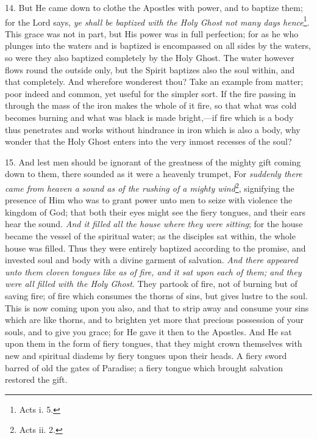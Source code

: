 14. But He came down to clothe the Apostles with power, and to baptize them; for the Lord says, \emph{ye shall be baptized with the Holy Ghost not many days hence}\footnote{Acts i. 5.}. This grace was not in part, but His power was in full perfection; for as he who plunges into the waters and is baptized is encompassed on all sides by the waters, so were they also baptized completely by the Holy Ghost. The water however flows round the outside only, but the Spirit baptizes also the soul within, and that completely. And wherefore wonderest thou? Take an example from matter; poor indeed and common, yet useful for the simpler sort. If the fire passing in through the mass of the iron makes the whole of it fire, so that what was cold becomes burning and what was black is made bright,—if fire which is a body thus penetrates and works without hindrance in iron which is also a body, why wonder that the Holy Ghost enters into the very inmost recesses of the soul?

15. And lest men should be ignorant of the greatness of the mighty gift coming down to them, there sounded as it were a heavenly trumpet, For \emph{suddenly there came from heaven a sound as of the rushing of a mighty wind}\footnote{Acts ii. 2.}, signifying the presence of Him who was to grant power unto men to seize with violence the kingdom of God; that both their eyes might see the fiery tongues, and their ears hear the sound. \emph{And it filled all the house where they were sitting}; for the house became the vessel of the spiritual water; as the disciples sat within, the whole house was filled. Thus they were entirely baptized according to the promise, and invested soul and body with a divine garment of salvation. \emph{And there appeared unto them cloven tongues like as of fire, and it sat upon each of them; and they were all filled with the Holy Ghost}. They partook of fire, not of burning but of saving fire; of fire which consumes the thorns of sins, but gives lustre to the soul. This is now coming upon you also, and that to strip away and consume your sins which are like thorns, and to brighten yet more that precious possession of your souls, and to give you grace; for He gave it then to the Apostles. And He sat upon them in the form of fiery tongues, that they might crown themselves with new and spiritual diadems by fiery tongues upon their heads. A fiery sword barred of old the gates of Paradise; a fiery tongue which brought salvation restored the gift.

